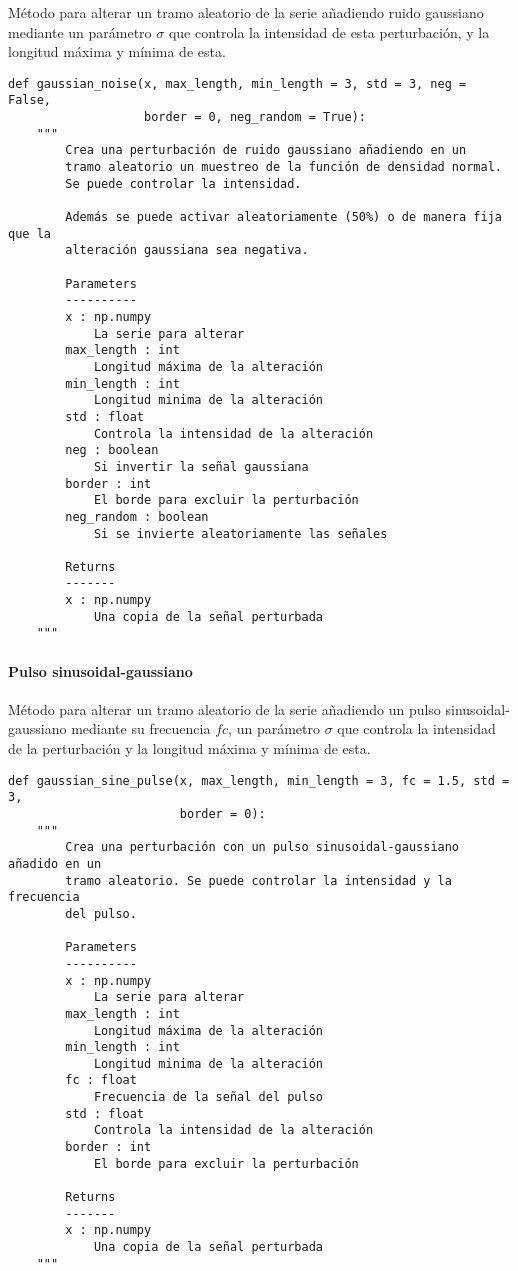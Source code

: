 Método para alterar un tramo aleatorio de la serie añadiendo ruido gaussiano mediante un parámetro $\sigma$ que controla la intensidad de esta perturbación, y la longitud máxima y mínima de esta.

\begin{lstlisting}
def gaussian_noise(x, max_length, min_length = 3, std = 3, neg = False,
                   border = 0, neg_random = True):
    """
        Crea una perturbación de ruido gaussiano añadiendo en un
        tramo aleatorio un muestreo de la función de densidad normal.
        Se puede controlar la intensidad.

        Además se puede activar aleatoriamente (50%) o de manera fija que la
        alteración gaussiana sea negativa.

        Parameters
        ----------
        x : np.numpy
            La serie para alterar
        max_length : int
            Longitud máxima de la alteración
        min_length : int
            Longitud minima de la alteración
        std : float
            Controla la intensidad de la alteración
        neg : boolean
            Si invertir la señal gaussiana
        border : int
            El borde para excluir la perturbación
        neg_random : boolean
            Si se invierte aleatoriamente las señales

        Returns
        -------
        x : np.numpy
            Una copia de la señal perturbada
    """
\end{lstlisting}

\paragraph{Pulso sinusoidal-gaussiano}

Método para alterar un tramo aleatorio de la serie añadiendo un pulso sinusoidal-gaussiano mediante su frecuencia $fc$, un parámetro $\sigma$ que controla la intensidad de la perturbación y la longitud máxima y mínima de esta.

\begin{lstlisting}
def gaussian_sine_pulse(x, max_length, min_length = 3, fc = 1.5, std = 3,
                        border = 0):
    """
        Crea una perturbación con un pulso sinusoidal-gaussiano añadido en un
        tramo aleatorio. Se puede controlar la intensidad y la frecuencia
        del pulso.

        Parameters
        ----------
        x : np.numpy
            La serie para alterar
        max_length : int
            Longitud máxima de la alteración
        min_length : int
            Longitud minima de la alteración
        fc : float
            Frecuencia de la señal del pulso
        std : float
            Controla la intensidad de la alteración
        border : int
            El borde para excluir la perturbación

        Returns
        -------
        x : np.numpy
            Una copia de la señal perturbada
    """
\end{lstlisting}

